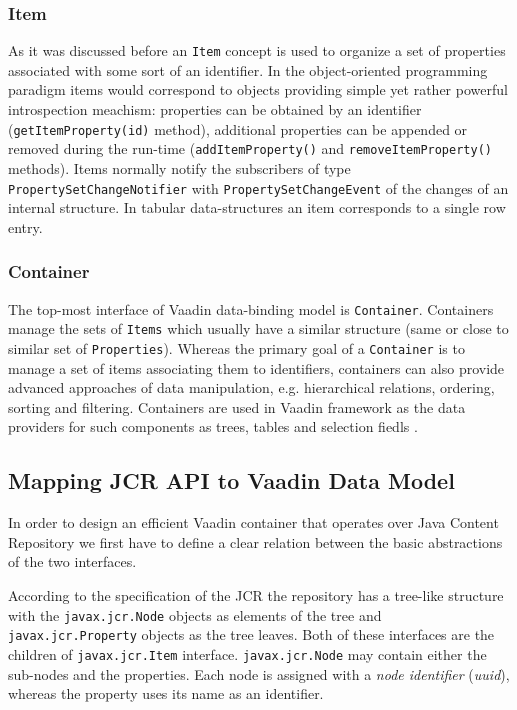 \subsubsection{Item}
As it was discussed before an \texttt{Item} concept is used to organize a set of
properties associated with some sort of an identifier. In the object-oriented
programming paradigm items would correspond to objects providing simple yet
rather powerful introspection meachism:
properties can be obtained by an identifier (\texttt{getItemProperty(id)}
method), additional properties can be appended or removed during the run-time
(\texttt{addItemProperty()} and \texttt{removeItemProperty()} methods). Items
normally notify the subscribers of type \texttt{PropertySetChangeNotifier} with
\texttt{PropertySetChangeEvent} of the changes of an internal structure. In
tabular data-structures an item corresponds to a single row entry.

\subsubsection{Container}
The top-most interface of Vaadin data-binding model is \texttt{Container}.
Containers manage the sets of \texttt{Items} which usually have a similar
structure (same or close to similar set of \texttt{Properties}). Whereas the
primary goal of a \texttt{Container} is to manage a set of items associating
them to identifiers, containers can also provide advanced approaches of data
manipulation, e.g. hierarchical relations, ordering, sorting and filtering.
Containers are used in Vaadin framework as the data providers for such
components as trees, tables and selection fiedls \cite{vaadin_data_model}.

\subsection{Mapping JCR API to Vaadin Data Model}
In order to design an efficient Vaadin container that operates over Java Content
Repository we first have to define a clear relation between the basic
abstractions of the two interfaces.

According to the specification of the JCR \cite{jcr_specification} the
repository has a tree-like structure with the \texttt{javax.jcr.Node} objects as
elements of the tree and \texttt{javax.jcr.Property} objects as the tree leaves.
Both of these interfaces are the children of \texttt{javax.jcr.Item} interface.
\texttt{javax.jcr.Node} may contain either the sub-nodes and the properties.  
Each node is assigned with a \emph{node identifier} (\emph{uuid}), whereas the property
uses its name as an identifier.

